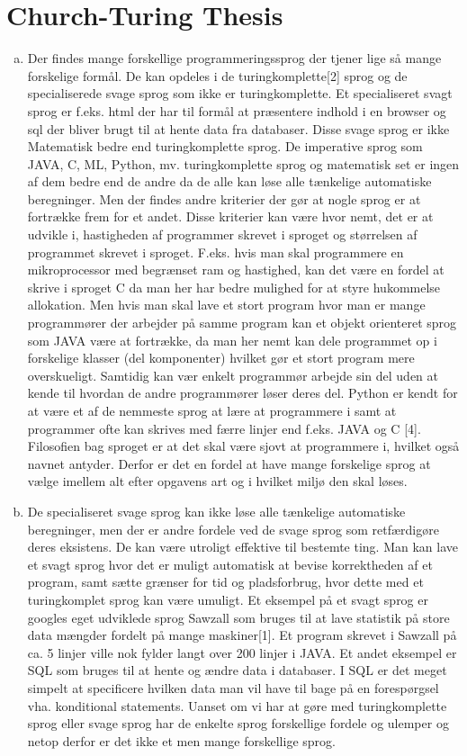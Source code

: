 \documentclass[12pt]{article}
\begin{document}
\section{Church-Turing Thesis}
\begin{enumerate}[(a)]

\item
Der findes mange forskellige programmeringssprog der tjener lige så mange forskelige formål. De kan
opdeles i de turingkomplette[2] sprog og de specialiserede svage sprog som ikke er turingkomplette.
Et specialiseret svagt sprog er f.eks. html der har til formål at præsentere indhold i en browser og
sql der bliver brugt til at hente data fra databaser. Disse svage sprog er ikke Matematisk bedre end
turingkomplette sprog. De imperative sprog som JAVA, C, ML, Python, mv. turingkomplette sprog og matematisk
set er ingen af dem bedre end de andre da de alle kan løse alle tænkelige automatiske beregninger. Men der
findes andre kriterier der gør at nogle sprog er at fortrække frem for et andet. Disse kriterier kan være
hvor nemt, det er at udvikle i, hastigheden af programmer skrevet i sproget og størrelsen af programmet
skrevet i sproget.
F.eks. hvis man skal programmere en mikroprocessor med begrænset ram og hastighed, kan det være en fordel
at skrive i sproget C da man her har bedre mulighed for at styre hukommelse allokation.
Men hvis man skal lave et stort program hvor man er mange programmører der arbejder på samme program kan
et objekt orienteret sprog som JAVA være at fortrække, da man her nemt kan dele programmet op i forskelige
klasser (del komponenter) hvilket gør et stort program mere overskueligt. Samtidig kan vær enkelt programmør
arbejde sin del uden at kende til hvordan de andre programmører løser deres del.
Python er kendt for at være et af de nemmeste sprog at lære at programmere i samt at programmer ofte kan
skrives med færre linjer end f.eks. JAVA og C [4]. Filosofien bag sproget er at det skal være sjovt at
programmere i, hvilket også navnet antyder.
Derfor er det en fordel at have mange forskelige sprog at vælge imellem alt efter opgavens art og i hvilket
miljø den skal løses.
\item
De specialiseret svage sprog kan ikke løse alle tænkelige automatiske beregninger, men der er andre fordele
ved de svage sprog som retfærdigøre deres eksistens. De kan være utroligt effektive til bestemte ting. Man
kan lave et svagt sprog hvor det er muligt automatisk at bevise korrektheden af et program, samt sætte grænser
for tid og pladsforbrug, hvor dette med et turingkomplet sprog kan være umuligt. Et eksempel på et svagt sprog
er googles eget udviklede sprog Sawzall som bruges til at lave statistik på store data mængder fordelt på mange
maskiner[1]. Et program skrevet i Sawzall på ca. 5 linjer ville nok fylder langt over 200 linjer i JAVA. Et andet
eksempel er SQL som bruges til at hente og ændre data i databaser. I SQL er det meget simpelt at specificere hvilken
data man vil have til bage på en forespørgsel vha. konditional statements. 
Uanset om vi har at gøre med turingkomplette sprog eller svage sprog har de enkelte sprog forskellige fordele og
ulemper og netop derfor er det ikke et men mange forskellige sprog.
\end{enumerate}
\end{document}
